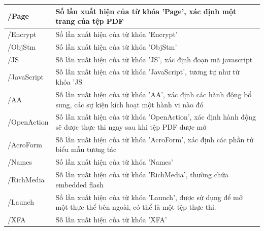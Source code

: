 \documentclass[./../main.tex]{subfiles}
\begin{document}
\begin{longtable}[c]{|p{}|p{}|}
	/Page                                     & Số lần xuất hiện của từ khóa 'Page', xác định một trang của tệp PDF                                                         \\ \hline
	/Encrypt                                  & Số lần xuất hiện của từ khóa 'Encrypt'                                                                                      \\ \hline
	/ObjStm                                   & Số lần xuất hiện của từ khóa 'ObjStm'                                                                                       \\ \hline
	/JS                                       & Số lần xuất hiện của từ khóa 'JS', xác định đoạn mã javascript                                                              \\ \hline
	/JavaScript                               & Số lần xuất hiện của từ khóa 'JavaScript', tương tự như từ khóa 'JS                                                         \\ \hline
	/AA                                       & Số lần xuất hiện của từ khóa 'AA', xác định các hành động bổ sung, các sự kiện kích hoạt một hành vi nào đó                 \\ \hline
	/OpenAction                               & Số lần xuất hiện của từ khóa 'OpenAction', xác định hành động sẽ được thực thi ngay sau khi tệp PDF được mở                 \\ \hline
	/AcroForm                                 & Số lần xuất hiện của từ khóa 'AcroForm', xác định các phần tử biểu mẫu tương tác                                            \\ \hline
	/Names                                    & Số lần xuất hiện của từ khóa 'Names'                                                                                        \\ \hline
	/RichMedia                                & Số lần xuất hiện của từ khóa 'RichMedia', thường chứa embedded flash                                                        \\ \hline
	/Launch                                   & Số lần xuất hiện của từ khóa 'Launch', được sử dụng để mở một thực thể bên ngoài, có thể là một tệp thực thi.               \\ \hline
	/XFA                                      & Số lần xuất hiện của từ khóa 'XFA'                                                                                          \\ \hline

\end{longtable}
\end{document}
